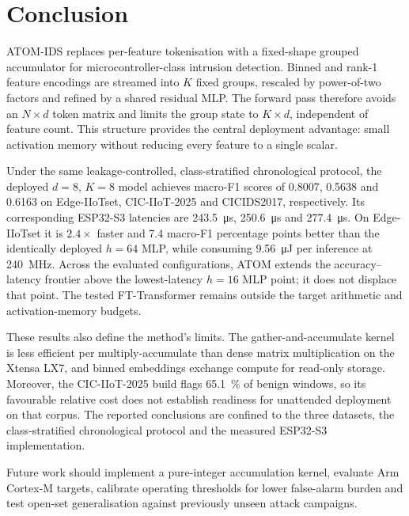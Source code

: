 \documentclass[10pt,letterpaper,twocolumn]{article}
\begin{document}
\fi



\section{Conclusion}
\label{sec:conclusion}

ATOM-IDS replaces per-feature tokenisation with a fixed-shape grouped
accumulator for microcontroller-class intrusion detection. Binned and rank-1
feature encodings are streamed into $K$ fixed groups, rescaled by power-of-two
factors and refined by a shared residual MLP. The forward pass therefore avoids
an $N\times d$ token matrix and limits the group state to $K\times d$, independent
of feature count. This structure provides the central deployment advantage:
small activation memory without reducing every feature to a single scalar.

Under the same leakage-controlled, class-stratified chronological protocol,
the deployed $d=8$, $K=8$ model achieves macro-F1 scores of 0.8007, 0.5638 and
0.6163 on Edge-IIoTset, CIC-IIoT-2025 and CICIDS2017, respectively. Its
corresponding ESP32-S3 latencies are \SI{243.5}{\micro\second},
\SI{250.6}{\micro\second} and \SI{277.4}{\micro\second}. On Edge-IIoTset it is
$2.4\times$ faster and 7.4 macro-F1 percentage points better than the identically
deployed $h=64$ MLP, while consuming \SI{9.56}{\micro\joule} per inference at
\SI{240}{\mega\hertz}. Across the evaluated configurations, ATOM extends the
accuracy--latency frontier above the lowest-latency $h=16$ MLP point; it does
not displace that point. The tested FT-Transformer remains outside the target
arithmetic and activation-memory budgets.

These results also define the method's limits. The gather-and-accumulate kernel
is less efficient per multiply-accumulate than dense matrix multiplication on
the Xtensa LX7, and binned embeddings exchange compute for read-only storage.
Moreover, the CIC-IIoT-2025 build flags \SI{65.1}{\percent} of benign windows,
so its favourable relative cost does not establish readiness for unattended
deployment on that corpus. The reported conclusions are confined to the three
datasets, the class-stratified chronological protocol and the measured
ESP32-S3 implementation.

Future work should implement a pure-integer accumulation kernel, evaluate Arm
Cortex-M targets, calibrate operating thresholds for lower false-alarm burden
and test open-set generalisation against previously unseen attack campaigns.
\end{document}
